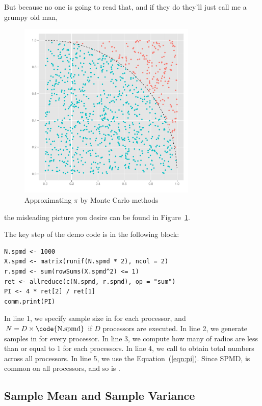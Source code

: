But because no one is going to read that, and if they do they'll just call me a grumpy old man,
\begin{figure}[h]
 \centering
 \includegraphics[height=8.5cm, width=8.5cm]{pbdDEMO-include/pics/misleading}
 \caption{Approximating $\pi$ by Monte Carlo methods}\label{pic:dumb}
\end{figure}
 the misleading picture you desire can be found in Figure~\ref{pic:dumb}.



The key step of the demo code is in the following block:
\begin{lstlisting}[language=rr,title=R Code]
N.spmd <- 1000
X.spmd <- matrix(runif(N.spmd * 2), ncol = 2)
r.spmd <- sum(rowSums(X.spmd^2) <= 1)
ret <- allreduce(c(N.spmd, r.spmd), op = "sum")
PI <- 4 * ret[2] / ret[1]
comm.print(PI)
\end{lstlisting}

In line 1, we specify sample size in  for each processor,
and $N=D\times\mbox{\code{N.spmd}}$ if $D$ processors are executed.
In line 2, we generate samples in  for every processor.
In line 3, we compute how many of radios are less than or equal to $1$
for each processors.
In line 4, we call  to obtain total numbers across all
processors.
In line 5, we use the Equation~(\ref{eqn:pi}).
Since SPMD,  is common on all processors, and so is .




\subsection[Sample Mean and Sample Variance]{Sample Mean and Sample Variance}
\label{sec:sample_stat}

